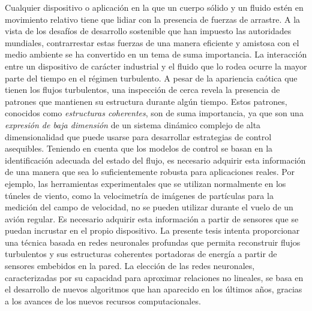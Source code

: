 %
%
\begin{abstrakt}

	\noindent Cualquier dispositivo o aplicación en la que un cuerpo sólido y un fluido estén en movimiento relativo tiene que lidiar con la presencia de fuerzas de arrastre.
	A la vista de los desafíos de desarrollo sostenible que han impuesto las autoridades mundiales, contrarrestar	estas fuerzas de una manera eficiente y amistosa con el medio ambiente se ha convertido en un tema de suma importancia.
	La interacción entre un dispositivo de carácter industrial y el fluido que lo rodea ocurre la mayor parte del tiempo en el régimen turbulento.
	A pesar de la apariencia caótica que tienen los flujos turbulentos, una inspección de cerca revela la presencia de patrones que mantienen su estructura durante algún tiempo.
	Estos patrones, conocidos como \textit{estructuras coherentes}, son de suma importancia, ya que son una \textit{expresión de baja dimensión} de un sistema dinámico complejo de alta dimensionalidad que puede usarse para desarrollar estrategias de control asequibles.
	Teniendo en cuenta que los modelos de control se basan en la identificación adecuada del estado del flujo, es necesario adquirir esta información de una manera que sea lo suficientemente robusta para aplicaciones reales.
	Por ejemplo, las herramientas experimentales que se utilizan normalmente en los túneles de viento, como la velocimetría de imágenes de partículas para la medición del campo de velocidad, no se pueden utilizar durante el vuelo de un avión regular.
	Es necesario adquirir esta información a partir de sensores que se puedan incrustar en el propio dispositivo.
	La presente tesis intenta proporcionar una técnica basada en redes neuronales profundas que permita reconstruir flujos turbulentos y sus estructuras coherentes portadoras de energía a partir de sensores embebidos en la pared.
	La elección de las redes neuronales, caracterizadas por su capacidad para aproximar relaciones no lineales, se basa en el desarrollo de nuevos algoritmos que han aparecido en los últimos años, gracias a los avances de los nuevos recursos computacionales.


\end{abstrakt}
